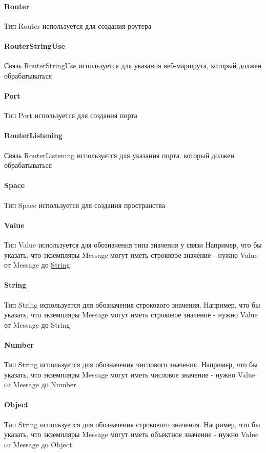 \paragraph*{Router}\hypertarget{Core.Router.Description}{}
Тип Router используется для создания роутера
\paragraph*{RouterStringUse}\hypertarget{Core.RouterStringUse.Description}{}
Связь RouterStringUse используется для
указания веб-маршрута, который должен обрабатываться
\paragraph*{Port}\hypertarget{Core.Port.Description}{}
Тип Port используется для создания порта
\paragraph*{RouterListening}\hypertarget{Core.RouterListening.Description}{}
Связь RouterListening используется для
указания порта, который должен обрабатываться
\paragraph*{Space}\hypertarget{Core.Space.Description}{}
Тип Space используется для создания пространства
\paragraph*{Value}
Тип Value используется для обозначения типа значения у связи
Например, что бы указать, что экземпляры Message могут иметь строковое значение - нужно Value от Message до \hyperlink{Core.String.Description}{String}
\paragraph*{String}
Тип String используется для обозначения строкового значения. Например, что бы указать, что экземпляры Message могут иметь строковое значение - нужно Value от Message до String
\paragraph*{Number}
Тип String используется для обозначения числового значения. Например, что бы указать, что экземпляры Message могут иметь числовое значение - нужно Value от Message до Number
\paragraph*{Object}
Тип String используется для обозначения строкового значения. Например, что бы указать, что экземпляры Message могут иметь объектное значение - нужно Value от Message до Object